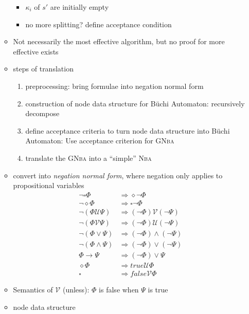 \documentclass[a4paper, 10pt]{article}
\begin{document}
\begin{itemize}
\begin{itemize}
\begin{itemize}
            \item $\kappa_i$ of $s'$ are initially empty
            \item no more splitting? define acceptance condition
        \end{itemize}
        \item Not necessarily the most effective algorithm, but no proof for more effective exists
        \item steps of translation
        \begin{enumerate}
            \item preprocessing: bring formulae into negation normal form
            \item construction of node data structure for Büchi Automaton: recursively decompose
            \item define acceptance criteria to turn node data structure into Büchi Automaton: Use acceptance criterion for \textsc{GNba}
            \item translate the \textsc{GNba} into a ``simple'' \textsc{Nba}
        \end{enumerate}
        \item convert into \emph{negation normal form}, where negation only applies to propositional variables
        \begin{align*}
        \neg\square\Phi             &\Rightarrow \diamond\neg\Phi \\
        \neg\diamond\Phi            &\Rightarrow \square\neg\Phi \\
        \neg(\Phi \mathcal{U}\Psi)  &\Rightarrow (\neg\Phi)\mathcal{V}(\neg\Psi) \\
        \neg(\Phi \mathcal{V}\Psi)  &\Rightarrow (\neg\Phi)\mathcal{U}(\neg\Psi) \\
        \neg(\Phi\vee\Psi)          &\Rightarrow (\neg\Phi)\wedge(\neg\Psi) \\
        \neg(\Phi\wedge\Psi)        &\Rightarrow (\neg\Phi)\vee(\neg\Psi) \\
        \Phi\to\Psi                 &\Rightarrow (\neg\Phi)\vee\Psi \\
        \diamond\Phi                &\Rightarrow  true \mathcal{U}\Phi \\
        \square                     &\Rightarrow  false \mathcal{V}\Phi
        \end{align*}
        \item Semantics of $\mathcal{V}$ (unless): $\Phi$ is false when $\Psi$ is true 
        \item node data structure

\end{itemize}
\end{itemize}
\end{document}
